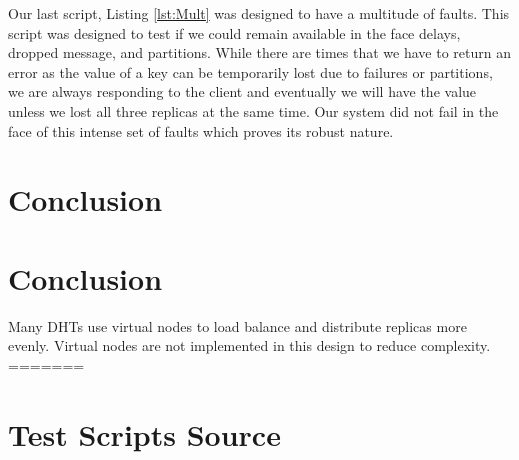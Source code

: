 \documentclass[11pt]{article}
\begin{document}
Our last script, Listing \ref{lst:Mult} was designed to have a multitude of faults. This script was designed to test if we could remain available in the face delays, dropped message, and partitions. While there are times that we have to return an error as the value of a key can be temporarily lost due to failures or partitions, we are always responding to the client and eventually we will have the value unless we lost all three replicas at the same time. Our system did not fail in the face of this intense set of faults which proves its robust nature.

\section{Conclusion}\label{sec:Conc}



\section{Conclusion}\label{sec:Conc}
Many DHTs use virtual nodes to load balance and distribute replicas more evenly. Virtual nodes are not implemented in this design to reduce complexity.
=======

\clearpage

\printbibliography

\clearpage

\appendix

\section{Test Scripts Source}
\end{document}
